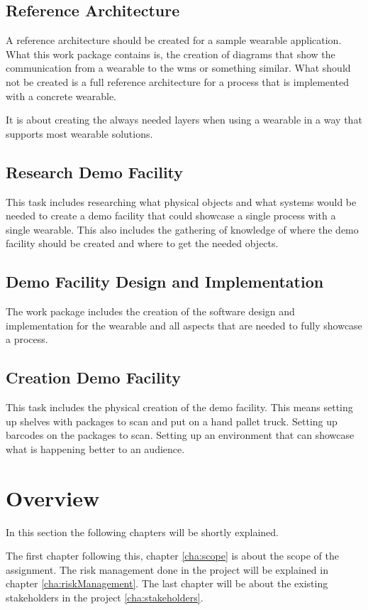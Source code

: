 \subsection{Reference Architecture}
A reference architecture should be created for a sample wearable application. What this work package contains is, the creation of diagrams that show the communication from a wearable to the \gls{wms} or something similar. What should not be created is a full reference architecture for a process that is implemented with a concrete wearable. 

It is about creating the always needed layers when using a wearable in a way that supports most wearable solutions.

\subsection{Research Demo Facility}
This task includes researching what physical objects and what systems would be needed to create a demo facility that could showcase a single process with a single wearable. This also includes the gathering of knowledge of where the demo facility should be created and where to get the needed objects.

\subsection{Demo Facility Design and Implementation}
The work package includes the creation of the software design and implementation for the wearable and all aspects that are needed to fully showcase a process.

\subsection{Creation Demo Facility}
This task includes the physical creation of the demo facility. This means setting up shelves with packages to scan and put on a hand pallet truck. Setting up barcodes on the packages to scan. Setting up an environment that can showcase what is happening better to an audience.


\section{Overview}
In this section the following chapters will be shortly explained. 

The first chapter following this, chapter \ref{cha:scope} is about the scope of the assignment. The risk management done in the project will be explained in chapter \ref{cha:riskManagement}. The last chapter will be about the existing stakeholders in the project \ref{cha:stakeholders}.